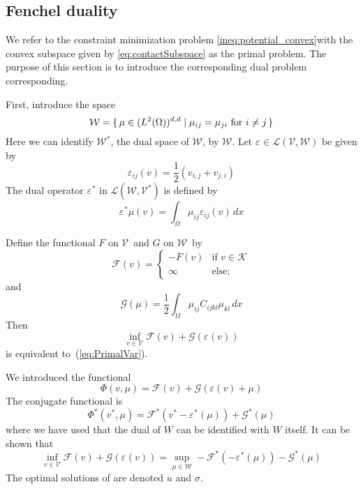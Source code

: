 \documentclass[12pt,a4paper]{article}
\numberwithin{equation}{section}
\numberwithin{table}{section}
\numberwithin{figure}{section}
\newcommand{\W}{\ensuremath{\mathcal{W}}}
\newcommand{\half}{\ensuremath{\frac{1}{2}}}
\newcommand{\V}{\ensuremath{\mathcal{V}}}
\newcommand{\K}{\ensuremath{\mathcal{K}}}
\renewcommand{\L}{{\mathcal L}}
\newcommand{\F}{\ensuremath{{\mathcal F}}}
\newcommand{\G}{\ensuremath{{\mathcal G}}}
\newcommand{\intO}{\int_\Omega\!\!}
\renewcommand{\epsilon}{\varepsilon}
\newcommand{\strain}[1][]{\ensuremath{\epsilon_{#1}}}
\newcommand{\epsij}{\strain[ij]}
\newcommand{\stress}[1][]{\ensuremath{\sigma_{#1}}}
\providecommand{\dualp}[2]{\langle #1, #2 \rangle}
\newcommand{\infvinV}{\ensuremath{\inf_{v\in \V}}}
\newcommand{\dx}{{\,dx}}
\begin{document}
\subsection{Fenchel duality}

We refer to the constraint minimization problem \eqref{ineq:potential_convex}with the convex subspace given by \eqref{eq:contactSubspace} as the primal problem. The purpose of this section is to introduce the corresponding dual problem corresponding.

First, introduce the space
\begin{equation}
  \W = \set{\mu \in (L^2(\Omega))^{d,d} | \mu_{ij} = \mu_{ji}
    \text{ for } i\ne j } 
\end{equation}
Here we can identify $\W^*$, the dual space of $\W$, by $\W$.  Let $\strain \in \L(\V,\W)$
be given by
\begin{equation}
  \epsij(v) = \half (v_{i,j} + v_{j,i})
\end{equation}
The dual operator
$\strain^*$ in $\L(\W,\V^*)$ is defined by
\begin{equation}
  \strain^* \mu(v) = \intO \mu_{ij} \epsij(v) \dx
\end{equation}

Define the functional $F$ on \V\ and $G$ on \W\ by
\begin{equation}
  \F(v) =
  \begin{cases}
    -F(v) & \text{if } v \in \K \\
    \infty & \text{else;}
  \end{cases}
\end{equation}
and
\begin{equation}
  \G(\mu) = \half \intO \mu_{ij} C_{ijkl} \mu_{kl} \dx
\end{equation}
Then
\begin{equation}
  \label{ineq:primalFenchel}
  \infvinV \F(v) + \G(\strain(v))
\end{equation}
is equivalent to~(\ref{eq:PrimalVar}).

We introduced the functional
\begin{equation}
\varPhi(v,\mu) = \F(v) + \G(\epsilon(v) + \mu)
\end{equation}
The conjugate functional is
\begin{equation}
  \varPhi^*(v^*, \mu) = \F^*(v^* - \strain^*(\mu)) + \G^*(\mu)
\end{equation}
where we have used that the dual of $W$ can be identified with $W$ itself. It can be shown that
\begin{equation}
	\label{eq:infsup}
  \inf_{v\in \V} \F(v) + \G(\strain(v))
  = \sup_{\mu\in \W} -\F^*(-\strain^*(\mu)) - \G^*(\mu)
\end{equation}
The optimal solutions of are denoted $u$ and $ \stress$.
\end{document}

